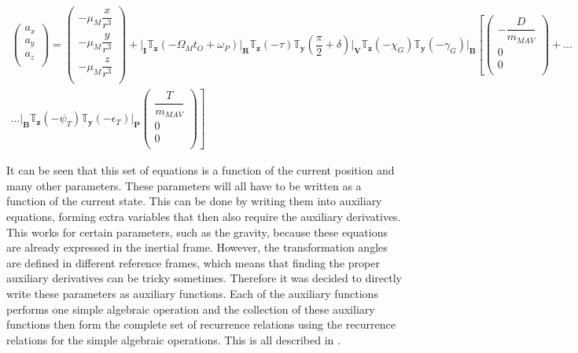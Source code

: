 \begin{multline} \label{eq:acc}
\begin{pmatrix}
a_{x}\\
a_{y}\\
a_{z}\\
\end{pmatrix}
=
\begin{pmatrix}
-\mu_{M}\dfrac{x}{r^{3}}\\
-\mu_{M}\dfrac{y}{r^{3}}\\
-\mu_{M}\dfrac{z}{r^{3}}\\
\end{pmatrix}+
\Bigg|_{\mathbf{I}}\mathbb{T}_{\mathbf{z}}\left(-\Omega_{M}t_{O}+\omega_{P}\right)\Bigg|_{\mathbf{R}}\mathbb{T}_{\mathbf{z}}\left(-\tau\right)\mathbb{T}_{\mathbf{y}}\left(\dfrac{\pi}{2}+\delta\right)\Bigg|_{\mathbf{V}}\mathbb{T}_{\mathbf{z}}\left(-\chi_{G}\right)\mathbb{T}_{\mathbf{y}}\left(-\gamma_{G}\right)\Bigg|_{\mathbf{B}}\left[
\begin{pmatrix}
-\dfrac{D}{m_{MAV}}\\
0\\
0\\
\end{pmatrix}
+  \right. \dots \\
\dotsc
 \left.
\Bigg|_{\mathbf{B}}\mathbb{T}_{\mathbf{z}}\left(-\psi_{T}\right)\mathbb{T}_{\mathbf{y}}\left(-\epsilon_{T}\right)\Bigg|_{\mathbf{P}}
\begin{pmatrix}
\dfrac{T}{m_{MAV}}\\
0\\
0\\
\end{pmatrix}
\right]
\end{multline}

It can be seen that this set of equations is a function of the current position and many other parameters. These parameters will all have to be written as a function of the current state. This can be done by writing them into auxiliary equations, forming extra variables that then also require the auxiliary derivatives. This works for certain parameters, such as the gravity, because these equations are already expressed in the inertial frame. However, the transformation angles are defined in different reference frames, which means that finding the proper auxiliary derivatives can be tricky sometimes. Therefore it was decided to directly write these parameters as auxiliary functions. Each of the auxiliary functions performs one simple algebraic operation and the collection of these auxiliary functions then form the complete set of recurrence relations using the recurrence relations for the simple algebraic operations. This is all described in . 

